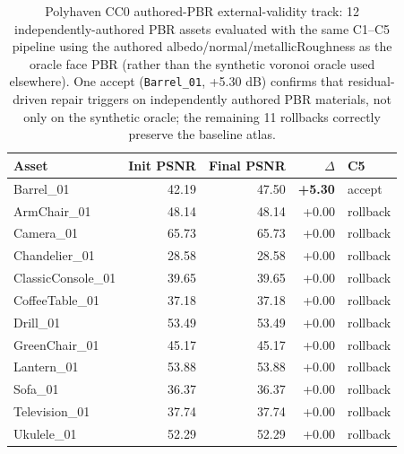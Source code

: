 \begin{table}[t]
\centering
\scriptsize
\caption{Polyhaven CC0 authored-PBR external-validity track: 12 independently-authored PBR assets evaluated with the same C1--C5 pipeline using the authored albedo/normal/metallicRoughness as the oracle face PBR (rather than the synthetic voronoi oracle used elsewhere). One accept (\texttt{Barrel\_01}, +5.30 dB) confirms that residual-driven repair triggers on independently authored PBR materials, not only on the synthetic oracle; the remaining 11 rollbacks correctly preserve the baseline atlas.}
\label{tab:polyhaven}
\begin{tabular}{@{}lrrrl@{}}
\toprule
Asset & Init PSNR & Final PSNR & $\Delta$ & C5 \\
\midrule
Barrel\_01 & 42.19 & 47.50 & \textbf{+5.30} & accept \\
\midrule
ArmChair\_01 & 48.14 & 48.14 & +0.00 & rollback \\
Camera\_01 & 65.73 & 65.73 & +0.00 & rollback \\
Chandelier\_01 & 28.58 & 28.58 & +0.00 & rollback \\
ClassicConsole\_01 & 39.65 & 39.65 & +0.00 & rollback \\
CoffeeTable\_01 & 37.18 & 37.18 & +0.00 & rollback \\
Drill\_01 & 53.49 & 53.49 & +0.00 & rollback \\
GreenChair\_01 & 45.17 & 45.17 & +0.00 & rollback \\
Lantern\_01 & 53.88 & 53.88 & +0.00 & rollback \\
Sofa\_01 & 36.37 & 36.37 & +0.00 & rollback \\
Television\_01 & 37.74 & 37.74 & +0.00 & rollback \\
Ukulele\_01 & 52.29 & 52.29 & +0.00 & rollback \\
\bottomrule
\end{tabular}
\end{table}
